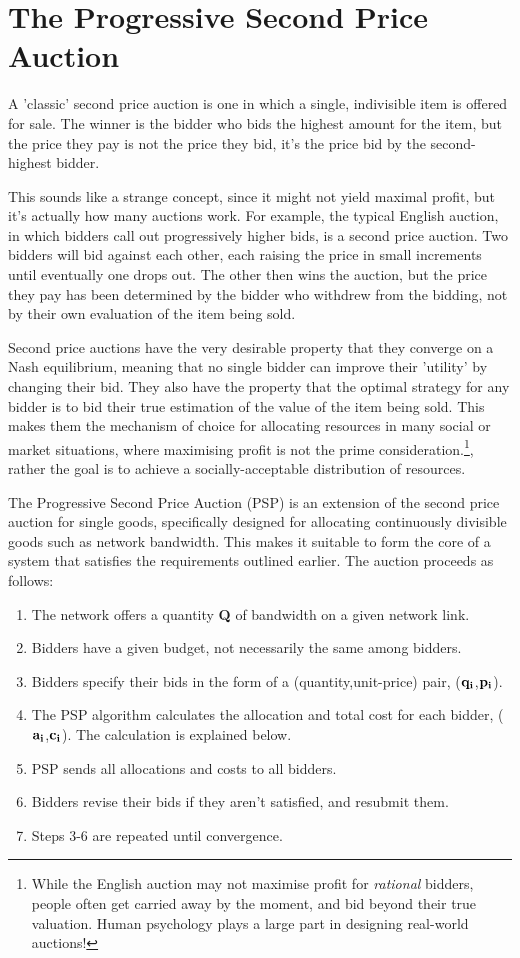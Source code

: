 \section{The Progressive Second Price Auction}

A 'classic' second price auction is one in which a single, indivisible item is offered for sale. The winner is the bidder who bids the highest amount for the item, but the price they pay is not the price they bid, it's the price bid by the second-highest bidder.

This sounds like a strange concept, since it might not yield maximal profit, but it's actually how many auctions work. For example, the typical English auction, in which bidders call out progressively higher bids, is a second price auction. Two bidders will bid against each other, each raising the price in small increments until eventually one drops out. The other then wins the auction, but the price they pay has been determined by the bidder who withdrew from the bidding, not by their own evaluation of the item being sold.

Second price auctions have the very desirable property that they converge on a Nash equilibrium, meaning that no single bidder can improve their 'utility' by changing their bid. They also have the property that the optimal strategy for any bidder is to bid their true estimation of the value of the item being sold. This makes them the mechanism of choice for allocating resources in many social or market situations, where maximising profit is not the prime consideration.\footnote{While the English auction may not maximise profit for {\it rational} bidders, people often get carried away by the moment, and bid beyond their true valuation. Human psychology plays a large part in designing real-world auctions!}, rather the goal is to achieve a socially-acceptable distribution of resources.

The Progressive Second Price Auction (PSP)\cite{PSP} is an extension of the second price auction for single goods, specifically designed for allocating continuously divisible goods such as network bandwidth. This makes it suitable to form the core of a system that satisfies the requirements outlined earlier. The auction proceeds as follows:

\begin{enumerate}
\item[1)] The network offers a quantity {\bf Q} of bandwidth on a given network link.
\item[2)] Bidders have a given budget, not necessarily the same among bidders.
\item[3)] Bidders specify their bids in the form of a (quantity,unit-price) pair, (${\bf q_i}$,${\bf p_i}$).
\item[4)] The PSP algorithm calculates the allocation and total cost for each bidder, (${\bf a_i}$,${\bf c_i}$). The calculation is explained below.
\item[5)] PSP sends all allocations and costs to all bidders.
\item[6)] Bidders revise their bids if they aren't satisfied, and resubmit them.
\item[7)] Steps 3-6 are repeated until convergence.
\end{enumerate}

